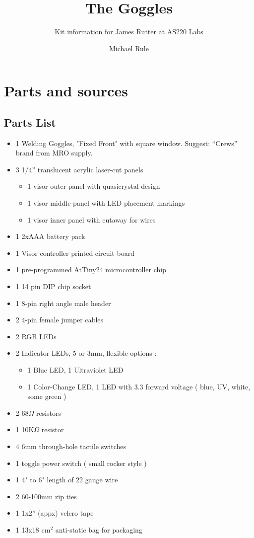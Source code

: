 \documentclass[11pt]{scrartcl}
\newenvironment{itemised}{
\begin{itemize}
  \setlength{\itemsep}{1pt}
  \setlength{\parskip}{0pt}
  \setlength{\parsep}{0pt}
}{\end{itemize}}
\begin{document}
\title{The Goggles}
\subtitle{Kit information for James Rutter at AS220 Labs}
\author{Michael Rule}
\date{}
\maketitle
{}
\tableofcontents
\newpage
\section{Parts and sources}
\subsection{Parts List}
\begin{itemised}
\item 1 Welding Goggles, "Fixed Front" with square window. Suggest: ``Crews'' brand from MRO supply.
\item 3 1/4'' translucent acrylic laser-cut panels
\begin{itemised}
	\item 1 visor outer panel with quasicrystal design
	\item 1 visor middle panel with LED placement markings
	\item 1 visor inner panel with cutaway for wires
	\end{itemised}
	\item 1 2xAAA battery pack
	\item 1 Visor controller printed circuit board
	\item 1 pre-programmed AtTiny24 microcontroller chip
	\item 1 14 pin DIP chip socket
	\item 1 8-pin right angle male header
	\item 2 4-pin female jumper cables
	\item 2 RGB LEDs
	\item 2 Indicator LEDs, 5 or 3mm, flexible options :
	\begin{itemised}
	\item 1 Blue LED, 1 Ultraviolet LED
	\item 1 Color-Change LED, 1 LED with 3.3 forward voltage ( blue, UV, white, some green )
	\end{itemised}
	\item 2 68$\Omega$ resistors	
	\item 1 10K$\Omega$ resistor   	
	\item 4 6mm through-hole tactile switches
	\item 1 toggle power switch ( small rocker style )
	\item 1 4" to 6" length of 22 gauge wire
	\item 2 60-100mm zip ties
	\item 1 1x2'' (appx) velcro tape
	\item 1 13x18 cm${}^2$ anti-static bag for packaging
\end{itemised}
\newpage
\end{document}
